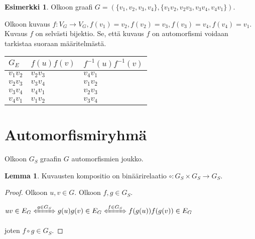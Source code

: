 \documentclass[a4paper, 12pt]{article}
\theoremstyle{definition}
\newtheorem{lemma}{Lemma}
\newtheorem{example}[mydef]{Esimerkki}
\theoremstyle{plain}
\begin{document}
\begin{example}
\label{ex:d4}
Olkoon graafi $G = (\{v_1, v_2, v_3, v_4\}, \{v_1v_2, v_2v_3, v_3v_4, v_4v_1\})$.

\begin{center}
\end{center}

Olkoon kuvaus $f: V_G \rightarrow V_G, f(v_1) = v_2, f(v_2) = v_3, f(v_3) = v_4, f(v_4) = v_1$. Kuvaus $f$ on selvästi bijektio. Se, että kuvaus $f$ on automorfismi voidaan tarkistaa suoraan määritelmästä.

\begin{center}
\begin{tabular} {l l l}
$G_E$ & $f(u)f(v)$ & $f^{-1}(u)f^{-1}(v)$ \\
\hline
$v_1v_2$ & $ v_2v_3$ & $v_4v_1$ \\
$v_2v_3$ & $ v_3v_4$ & $v_1v_2$ \\
$v_3v_4$ & $v_4v_1$ & $v_2v_3$ \\
$v_4v_1$ & $v_1v_2$ &  $v_3v_4$ \\
\end{tabular}

\end{center}
\end{example}

\section{Automorfismiryhmä}

Olkoon $G_S$ graafin $G$ automorfismien joukko.

\begin{lemma}
\label{lemma:binaarirelaatio}
Kuvausten kompositio on binäärirelaatio $\circ : G_S \times G_S \rightarrow G_S$.
\begin{proof}
Olkoon $u, v \in G$. Olkoon $f, g \in G_S$.
\begin{center}
\begin{math}
uv \in E_G \xLeftrightarrow{g \in G_S} g(u)g(v) \in E_G  \xLeftrightarrow{f \in G_S} f(g(u))f(g(v)) \in E_G 
\end{math}
\end{center}
joten $f \circ g \in G_S$.
\end{proof}
\end{lemma}
\end{document}
